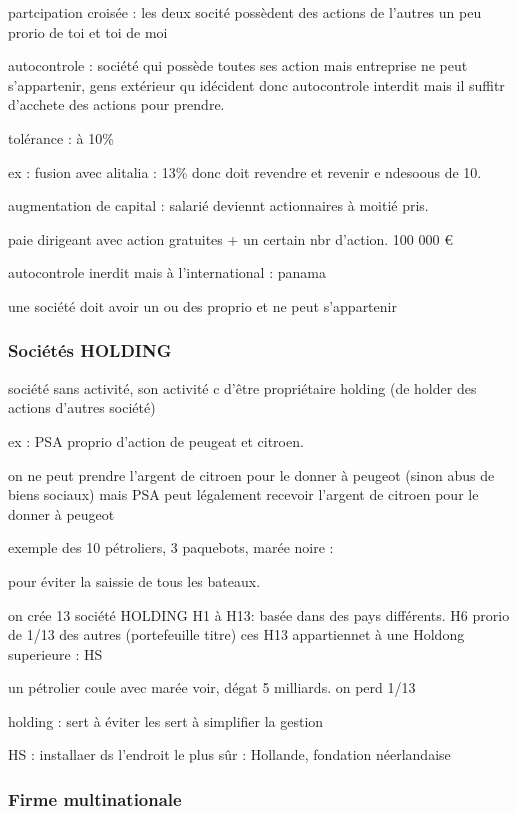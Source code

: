 \documentclass[a4paper,12pt]{article}
\begin{document}
partcipation croisée : les  deux socité possèdent des actions de l'autres
un peu prorio de toi et toi de moi



autocontrole : société qui possède toutes ses action
mais entreprise ne peut s'appartenir, gens extérieur qu idécident
donc autocontrole interdit mais il suffitr d'acchete des actions pour prendre.


tolérance : à 10\%

ex : fusion avec alitalia : 13\%  donc doit revendre et revenir e ndesoous de 10.

augmentation de capital : salarié deviennt actionnaires à moitié pris.

paie dirigeant avec action gratuites + un certain nbr d'action.
100 000 €

autocontrole inerdit mais à l'international : panama

une société doit avoir un ou des proprio et ne peut s'appartenir 

\subsubsection{Sociétés HOLDING} 

société sans activité, son activité c d'être propriétaire holding (de holder des actions d'autres société)

ex : PSA proprio d'action de peugeat et citroen.

on ne peut prendre l'argent de citroen pour le donner à peugeot (sinon abus de biens sociaux)  mais PSA peut légalement recevoir l'argent de citroen pour le donner à peugeot


exemple des 10 pétroliers, 3 paquebots, marée noire :

pour éviter la saissie  de tous les bateaux.

on crée 13 société HOLDING H1 à H13: basée dans des pays différents.
H6 prorio de 1/13 des autres (portefeuille titre)
ces H13 appartiennet à une Holdong superieure : HS

un pétrolier coule avec marée voir, dégat 5 milliards.
on perd 1/13 

holding : sert à éviter les 
sert à simplifier la gestion

HS : installaer ds l'endroit le plus sûr : Hollande, fondation néerlandaise



\subsubsection { Firme multinationale}
\end{document}

